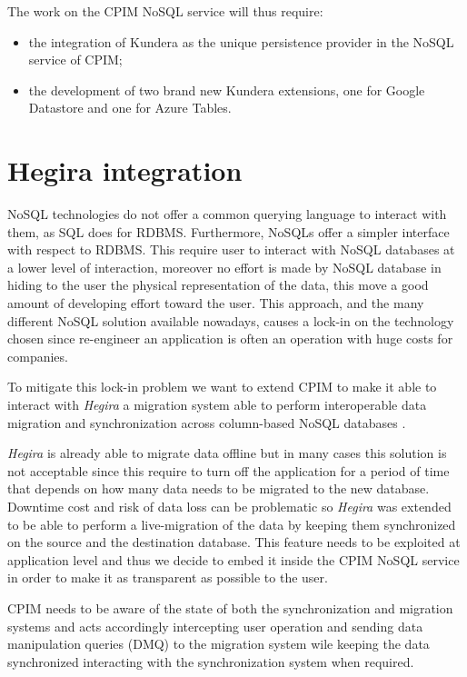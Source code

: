 \newparagraph The work on the CPIM NoSQL service will thus require:
\begin{itemize}
\item the integration of Kundera as the unique persistence provider in the NoSQL service of CPIM;
\item the development of two brand new Kundera extensions, one for Google Datastore and one for Azure Tables.
\end{itemize}

\section{Hegira integration}
NoSQL technologies do not offer a common querying language to interact with them, as SQL does for RDBMS. Furthermore, NoSQLs offer a simpler interface with respect to RDBMS. This require user to interact with NoSQL databases at a lower level of interaction, moreover no effort is made by NoSQL database in hiding to the user the physical representation of the data, this move a good amount of developing effort toward the user.
This approach, and the many different NoSQL solution available nowadays, causes a lock-in on the technology chosen since re-engineer an application is often an operation with huge costs for companies.

\newparagraph To mitigate this lock-in problem we want to extend CPIM to make it able to interact with \textit{Hegira} a migration system able to perform interoperable data migration and synchronization across column-based NoSQL databases \cite{paper:modaclouds-deliverable}.

\noindent \textit{Hegira} is already able to migrate data offline but in many cases this solution is not acceptable since this require to turn off the application for a period of time that depends on how many data needs to be migrated to the new database. 
Downtime cost and risk of data loss can be problematic so \textit{Hegira} was extended to be able to perform a live-migration of the data by keeping them synchronized on the source and the destination database.
This feature needs to be exploited at application level and thus we decide to embed it inside the CPIM NoSQL service in order to make it as transparent as possible to the user.

\noindent CPIM needs to be aware of the state of both the synchronization and migration systems and acts accordingly intercepting user operation and sending data manipulation queries (DMQ) to the migration system wile keeping the data synchronized interacting with the synchronization system when required.